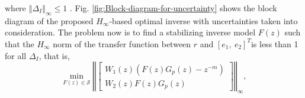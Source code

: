 \documentclass [11pt, proquest] {uwthesis}[2020/02/24]
\begin{document}
\noindent where $\left\Vert \Delta_{I}\right\Vert _{\infty}\leq1$
\cite{skogestad2007multivariable}. Fig. \ref{fig:Block-diagram-for-uncertainty}
shows the block diagram of the proposed $H_{\infty}$-based optimal
inverse with uncertainties taken into consideration. The problem now
is to find a stabilizing inverse model $F(z)$ such that the $H_{\infty}$
norm of the transfer function between $r$ and $[e_{1},\:e_{2}]^{T}$is
less than 1 for all $\Delta_{I}$, that is,
\begin{equation}
\min_{F(z)\in\mathcal{S}}\left\Vert \left[\begin{array}{c}
W_{1}(z)(F(z)G_{p}(z)-z^{-m})\\
W_{2}(z)F(z)G_{p}(z)
\end{array}\right]\right\Vert _{\infty},\label{eq:hinf-2-1}
\end{equation}
\end{document}
